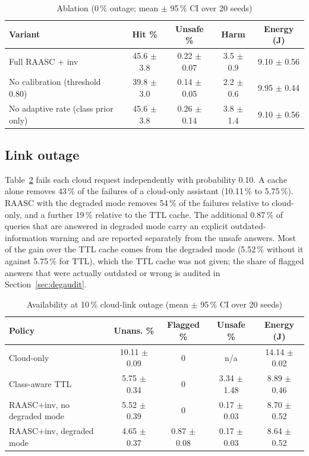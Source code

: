 \documentclass[journal]{IEEEtran}
\newcommand{\pct}{\,\%}
\begin{document}
\begin{table}[!t]
\caption{Ablation (0\pct{} outage; mean $\pm$ 95\pct{} CI over 20 seeds)}
\label{tab:ablation}
\centering\scriptsize
\setlength{\tabcolsep}{2pt}
\begin{tabular}{p{1.2in}cccc}
\toprule
Variant & Hit \% & Unsafe \% & Harm & Energy (J)\\
\midrule
Full RAASC $+$ inv & 45.6 $\pm$ 3.8 & 0.22 $\pm$ 0.07 & 3.5 $\pm$ 0.9 & 9.10 $\pm$ 0.56\\
No calibration (threshold 0.80) & 39.8 $\pm$ 3.0 & 0.14 $\pm$ 0.05 & 2.2 $\pm$ 0.6 & 9.95 $\pm$ 0.44\\
No adaptive rate (class prior only) & 45.6 $\pm$ 3.8 & 0.26 $\pm$ 0.14 & 3.8 $\pm$ 1.4 & 9.10 $\pm$ 0.56\\
\bottomrule
\end{tabular}
\end{table}

\subsection{Link outage}\label{sec:outage}
Table~\ref{tab:outage} fails each cloud request independently with probability 0.10. A cache alone removes 43\pct{} of the failures of a cloud-only assistant (10.11\pct{} to 5.75\pct{}). RAASC with the degraded mode removes 54\pct{} of the failures relative to cloud-only, and a further 19\pct{} relative to the TTL cache. The additional 0.87\pct{} of queries that are answered in degraded mode carry an explicit outdated-information warning and are reported separately from the unsafe answers. Most of the gain over the TTL cache comes from the degraded mode (5.52\pct{} without it against 5.75\pct{} for TTL), which the TTL cache was not given; the share of flagged answers that were actually outdated or wrong is audited in Section~\ref{sec:degaudit}.

\begin{table}[!t]
\caption{Availability at 10\pct{} cloud-link outage (mean $\pm$ 95\pct{} CI over 20 seeds)}
\label{tab:outage}
\centering\scriptsize
\setlength{\tabcolsep}{2pt}
\begin{tabular}{p{0.8in}cccc}
\toprule
Policy & Unans. \% & Flagged \% & Unsafe \% & Energy (J)\\
\midrule
Cloud-only & 10.11 $\pm$ 0.09 & 0 & n/a & 14.14 $\pm$ 0.02\\
Class-aware TTL & 5.75 $\pm$ 0.34 & 0 & 3.34 $\pm$ 1.48 & 8.89 $\pm$ 0.46\\
RAASC$+$inv, no degraded mode & 5.52 $\pm$ 0.39 & 0 & 0.17 $\pm$ 0.03 & 8.70 $\pm$ 0.52\\
RAASC$+$inv, degraded mode & 4.65 $\pm$ 0.37 & 0.87 $\pm$ 0.08 & 0.17 $\pm$ 0.03 & 8.64 $\pm$ 0.52\\
\bottomrule
\end{tabular}
\end{table}
\end{document}
